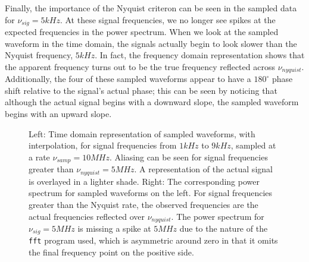 \documentclass[12pt]{article}
\begin{document}
Finally, the importance of the Nyquist criteron can be seen in the sampled data for $\nu_{sig} = 5 kHz$. At these signal frequencies, we no longer see spikes at the expected frequencies in the power spectrum. When we look at the sampled waveform in the time domain, the signals actually begin to look slower than the Nyquist frequency, $5 kHz$. In fact, the frequency domain representation shows that the apparent frequency turns out to be the true frequency reflected across $\nu_{nyquist}$. Additionally, the four of these sampled waveforms appear to have a $180^\circ$ phase shift relative to the signal's actual phase; this can be seen by noticing that although the actual signal begins with a downward slope, the sampled waveform begins with an upward slope.

\begin{figure}[H]
\caption[SODUMB]{Left: Time domain representation of sampled waveforms, with interpolation, for signal frequencies from $1 kHz$ to $9 kHz$, sampled at a rate $\nu_{samp}=10 MHz$. Aliasing can be seen for signal frequencies greater than $\nu_{nyquist}=5 MHz$. A representation of the actual signal is overlayed in a lighter shade. Right: The corresponding power spectrum for sampled waveforms on the left. For signal frequencies greater than the Nyquist rate, the observed frequencies are the actual frequencies reflected over $\nu_{nyquist}$. The power spectrum for $\nu_{sig}=5MHz$ is missing a spike at $5MHz$ due to the nature of the \texttt{fft} program used, which is asymmetric around zero in that it omits the final frequency point on the positive side.}
\label{fig:nyquist}
\end{figure}
\end{document}
